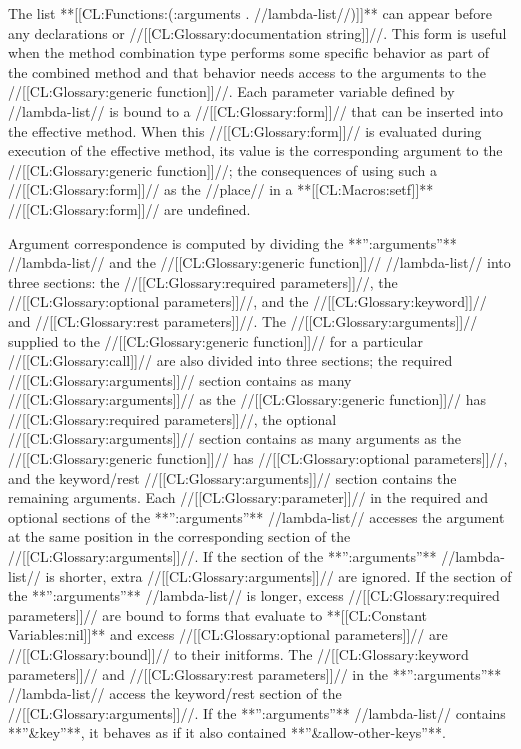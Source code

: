 The list **[[CL:Functions:(:arguments . //lambda-list//)]]** can appear before any declarations or //[[CL:Glossary:documentation string]]//. This form is useful when the method combination type performs some specific behavior as part of the combined method and that behavior needs access to the arguments to the //[[CL:Glossary:generic function]]//. Each parameter variable defined by //lambda-list// is bound to a //[[CL:Glossary:form]]// that can be inserted into the effective method. When this //[[CL:Glossary:form]]// is evaluated during execution of the effective method, its value is the corresponding argument to the //[[CL:Glossary:generic function]]//; the consequences of using such a //[[CL:Glossary:form]]// as the //place// in a **[[CL:Macros:setf]]** //[[CL:Glossary:form]]// are undefined.

Argument correspondence is computed by dividing the **'':arguments''** //lambda-list// and the //[[CL:Glossary:generic function]]// //lambda-list// into three sections: the //[[CL:Glossary:required parameters]]//, the //[[CL:Glossary:optional parameters]]//, and the //[[CL:Glossary:keyword]]// and //[[CL:Glossary:rest parameters]]//. The //[[CL:Glossary:arguments]]// supplied to the //[[CL:Glossary:generic function]]// for a particular //[[CL:Glossary:call]]// are also divided into three sections; the required //[[CL:Glossary:arguments]]// section contains as many //[[CL:Glossary:arguments]]// as the //[[CL:Glossary:generic function]]// has //[[CL:Glossary:required parameters]]//, the optional //[[CL:Glossary:arguments]]// section contains as many arguments as the //[[CL:Glossary:generic function]]// has //[[CL:Glossary:optional parameters]]//, and the keyword/rest //[[CL:Glossary:arguments]]// section contains the remaining arguments. Each //[[CL:Glossary:parameter]]// in the required and optional sections of the **'':arguments''** //lambda-list// accesses the argument at the same position in the corresponding section of the //[[CL:Glossary:arguments]]//. If the section of the **'':arguments''** //lambda-list// is shorter, extra //[[CL:Glossary:arguments]]// are ignored. If the section of the **'':arguments''** //lambda-list// is longer, excess //[[CL:Glossary:required parameters]]// are bound to forms that evaluate to **[[CL:Constant Variables:nil]]** and excess //[[CL:Glossary:optional parameters]]// are //[[CL:Glossary:bound]]// to their initforms. The //[[CL:Glossary:keyword parameters]]// and //[[CL:Glossary:rest parameters]]// in the **'':arguments''** //lambda-list// access the keyword/rest section of the //[[CL:Glossary:arguments]]//. If the **'':arguments''** //lambda-list// contains **''&key''**, it behaves as if it also contained **''&allow-other-keys''**.


